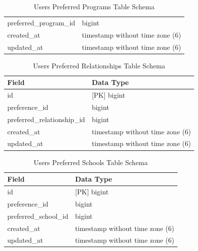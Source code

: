 \begin{enumerate}
\begin{table}[h!]
\begin{tabular}{ll}
    preferred\_program\_id       & bigint                             \\ 
    created\_at                  & timestamp without time zone (6)    \\ 
    updated\_at                  & timestamp without time zone (6)    \\ \hline
    \end{tabular}
    \caption{Users Preferred Programs Table Schema}
    \label{tab:Users Preferred Programs Table Schema}
    \end{table}
    \vspace{2cm} %
    \begin{table}[h!]
    \captionsetup{justification=centering, singlelinecheck=false, labelsep=space}
    \centering
    \begin{tabular}{ll}
    \hline
    \textbf{Field}               & \textbf{Data Type}                 \\ \hline
    id                           & [PK] bigint                        \\ 
    preference\_id               & bigint                             \\ 
    preferred\_relationship\_id  & bigint                             \\ 
    created\_at                  & timestamp without time zone (6)    \\ 
    updated\_at                  & timestamp without time zone (6)    \\ \hline
    \end{tabular}
    \caption{Users Preferred Relationships Table Schema}
    \label{tab:Users Preferred Relationships Table Schema}
    \end{table}
    \vspace{2cm} %
    \begin{table}[h!]
    \captionsetup{justification=centering, singlelinecheck=false, labelsep=space}
    \centering
    \begin{tabular}{ll}
    \hline
    \textbf{Field}               & \textbf{Data Type}                 \\ \hline
    id                           & [PK] bigint                        \\ 
    preference\_id               & bigint                             \\ 
    preferred\_school\_id        & bigint                             \\ 
    created\_at                  & timestamp without time zone (6)    \\ 
    updated\_at                  & timestamp without time zone (6)    \\ \hline
    \end{tabular}
    \caption{Users Preferred Schools Table Schema}
    \label{tab:Users Preferred Schools Table Schema}
    \end{table}
    \vspace{2cm} %
    

\end{enumerate}
